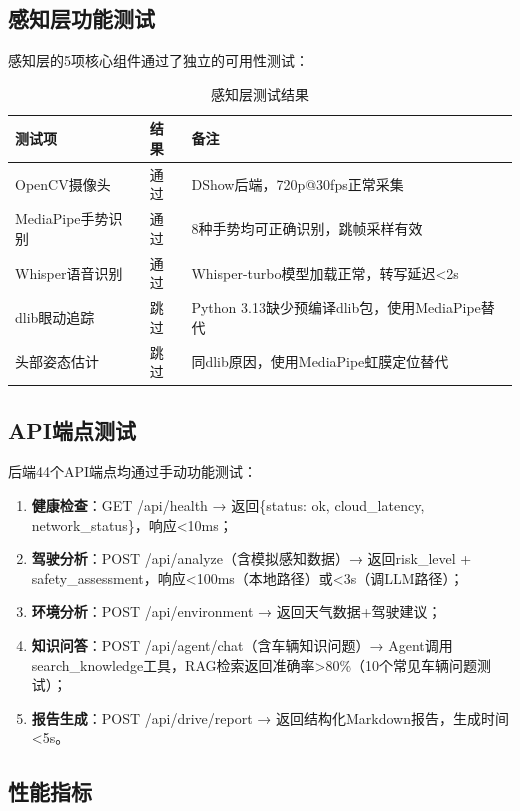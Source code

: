 \documentclass[a4paper]{article}
\begin{document}
\subsection{感知层功能测试}

感知层的5项核心组件通过了独立的可用性测试：

\begin{table}[H]
  \centering
  \caption{感知层测试结果}
  \label{tab:perception_test}
  \begin{tabular}{lll}
  \toprule
  测试项 & 结果 & 备注 \\
  \midrule
  OpenCV摄像头 & 通过 & DShow后端，720p@30fps正常采集 \\
  MediaPipe手势识别 & 通过 & 8种手势均可正确识别，跳帧采样有效 \\
  Whisper语音识别 & 通过 & Whisper-turbo模型加载正常，转写延迟<2s \\
  dlib眼动追踪 & 跳过 & Python 3.13缺少预编译dlib包，使用MediaPipe替代 \\
  头部姿态估计 & 跳过 & 同dlib原因，使用MediaPipe虹膜定位替代 \\
  \bottomrule
  \end{tabular}
\end{table}

\subsection{API端点测试}

后端44个API端点均通过手动功能测试：

\begin{enumerate}
    \item \textbf{健康检查}：GET /api/health → 返回\{status: ok, cloud\_latency, network\_status\}，响应<10ms；
    \item \textbf{驾驶分析}：POST /api/analyze（含模拟感知数据）→ 返回risk\_level + safety\_assessment，响应<100ms（本地路径）或<3s（调LLM路径）；
    \item \textbf{环境分析}：POST /api/environment → 返回天气数据+驾驶建议；
    \item \textbf{知识问答}：POST /api/agent/chat（含车辆知识问题）→ Agent调用search\_knowledge工具，RAG检索返回准确率>80\%（10个常见车辆问题测试）；
    \item \textbf{报告生成}：POST /api/drive/report → 返回结构化Markdown报告，生成时间<5s。
\end{enumerate}

\subsection{性能指标}
\end{document}
